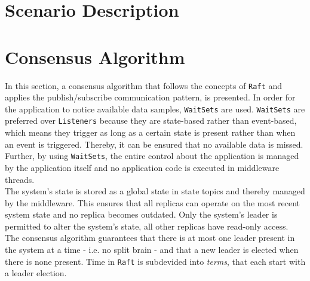 \section{Scenario Description}
\label{sec:ImpScenarioDescription}

\section{Consensus Algorithm}
\label{sec:ImpConsensusAlgorithm}

In this section, a consensus algorithm that follows the concepts of \texttt{Raft} and applies the  publish/subscribe communication pattern, is presented.
In order for the application to notice available data samples, \texttt{WaitSets} are used.
\texttt{WaitSets} are preferred over \texttt{Listeners} because they are state-based rather than event-based, which means they trigger as long as a certain state is present rather than when an event is triggered.
Thereby, it can be ensured that no available data is missed.
Further, by using \texttt{WaitSets}, the entire control about the application is managed by the application itself and no application code is executed in middleware threads.
\\

The system's state is stored as a global state in  state topics and thereby managed by the middleware.
This ensures that all replicas can operate on the most recent system state and no replica becomes outdated.
Only the system's leader is permitted to alter the system's state, all other replicas have read-only access.
\\

The consensus algorithm guarantees that there is at most one leader present in the system at a time - i.e. no split brain - and that a new leader is elected when there is none present.
Time in \texttt{Raft} is subdevided into \textit{terms}, that each start with a leader election.

